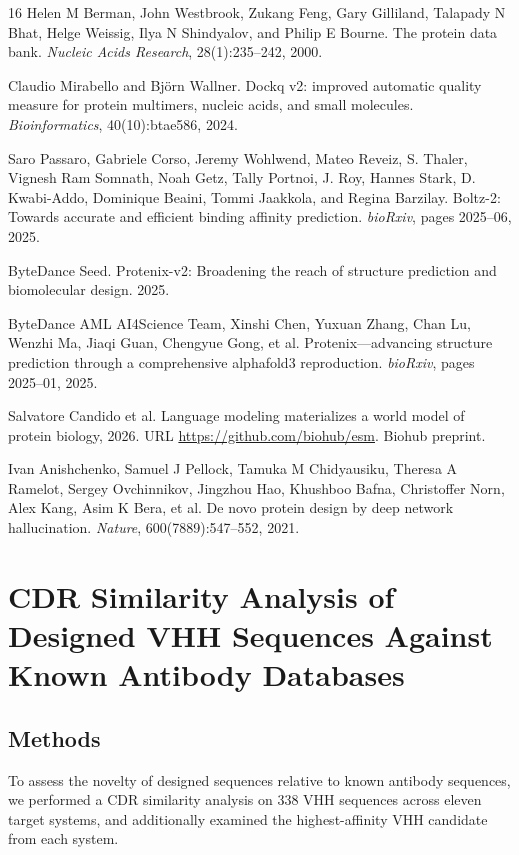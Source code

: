 \documentclass[11pt]{article}
\begin{document}
\begin{thebibliography}{16}
 Helen M Berman, John Westbrook, Zukang Feng, Gary Gilliland, Talapady N Bhat, Helge Weissig, Ilya N Shindyalov, and Philip E Bourne. The protein data bank. \emph{Nucleic Acids Research}, 28(1):235--242, 2000.

 Claudio Mirabello and Bj\"orn Wallner. Dockq v2: improved automatic quality measure for protein multimers, nucleic acids, and small molecules. \emph{Bioinformatics}, 40(10):btae586, 2024.

 Saro Passaro, Gabriele Corso, Jeremy Wohlwend, Mateo Reveiz, S. Thaler, Vignesh Ram Somnath, Noah Getz, Tally Portnoi, J. Roy, Hannes Stark, D. Kwabi-Addo, Dominique Beaini, Tommi Jaakkola, and Regina Barzilay. Boltz-2: Towards accurate and efficient binding affinity prediction. \emph{bioRxiv}, pages 2025--06, 2025.

 ByteDance Seed. Protenix-v2: Broadening the reach of structure prediction and biomolecular design. 2025.

 ByteDance AML AI4Science Team, Xinshi Chen, Yuxuan Zhang, Chan Lu, Wenzhi Ma, Jiaqi Guan, Chengyue Gong, et al. Protenix---advancing structure prediction through a comprehensive alphafold3 reproduction. \emph{bioRxiv}, pages 2025--01, 2025.

 Salvatore Candido et al. Language modeling materializes a world model of protein biology, 2026. URL \url{https://github.com/biohub/esm}. Biohub preprint.

 Ivan Anishchenko, Samuel J Pellock, Tamuka M Chidyausiku, Theresa A Ramelot, Sergey Ovchinnikov, Jingzhou Hao, Khushboo Bafna, Christoffer Norn, Alex Kang, Asim K Bera, et al. De novo protein design by deep network hallucination. \emph{Nature}, 600(7889):547--552, 2021.

\end{thebibliography}

\appendix

\section{CDR Similarity Analysis of Designed VHH Sequences Against Known Antibody Databases}
\label{app:A}

\subsection{Methods}
To assess the novelty of designed sequences relative to known antibody sequences, we performed a CDR
similarity analysis on 338 VHH sequences across eleven target systems, and additionally examined the
highest-affinity VHH candidate from each system.
\end{document}
